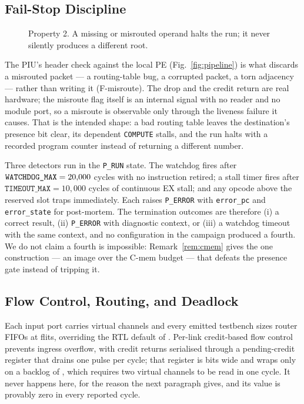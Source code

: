 \documentclass[journal,10pt]{IEEEtran}
\theoremstyle{plain}
\theoremstyle{definition}
\theoremstyle{remark}
\newcommand{\sv}[1]{\texttt{#1}}
\begin{document}
\subsection{Fail-Stop Discipline}\label{sec:fail-stop}

\begin{figure}[!t]\centering

\caption{Property 2. A missing or misrouted operand halts the run; it never silently produces a different root.}\label{fig:failstop}
\end{figure}


The PIU's header check against the local PE (Fig.~\ref{fig:pipeline}) is what
discards a misrouted packet --- a routing-table bug, a corrupted packet, a
torn adjacency --- rather than writing it (\textsf{F-misroute}). The drop and
the credit return are real hardware; the misroute flag itself is an internal signal with no reader and no
module port, so a misroute is observable only through the liveness failure it
causes. That is the intended shape: a bad routing table leaves the
destination's presence bit clear, its dependent \texttt{COMPUTE} stalls, and
the run halts with a recorded program counter instead of returning a
different number.

Three detectors run in the \texttt{P\_RUN} state. The watchdog fires after
$\sv{WATCHDOG\_MAX} = \WatchdogMax$ cycles with no instruction retired; a
stall timer fires after $\sv{TIMEOUT\_MAX} = 10{,}000$ cycles of continuous
\textsf{EX} stall; and any opcode above the reserved slot traps immediately.
Each raises \texttt{P\_ERROR} with \sv{error\_pc} and \sv{error\_state} for
post-mortem. The termination outcomes are therefore (i) a correct result,
(ii) \texttt{P\_ERROR} with diagnostic context, or (iii) a watchdog timeout
with the same context, and no configuration in the campaign produced a
fourth. We do not claim a fourth is impossible: Remark~\ref{rem:cmem} gives
the one construction --- an image over the \textsf{C-mem} budget --- that
defeats the presence gate instead of tripping it.

\subsection{Flow Control, Routing, and Deadlock}\label{sec:noc-route}

Each input port carries \NumVcs{} virtual channels and every emitted testbench
sizes router FIFOs at \BufDepthSim{} flits, overriding the RTL default of
\BufDepthRtl. Per-link credit-based flow control prevents ingress overflow,
with credit returns serialised through a pending-credit register that drains
one pulse per cycle; that register is \CreditCtrBits{} bits wide and wraps
only on a backlog of \CreditCtrWrap, which requires two virtual channels to be
read in one cycle. It never happens here, for the reason the next paragraph
gives, and its value is provably zero in every reported cycle.
\end{document}

